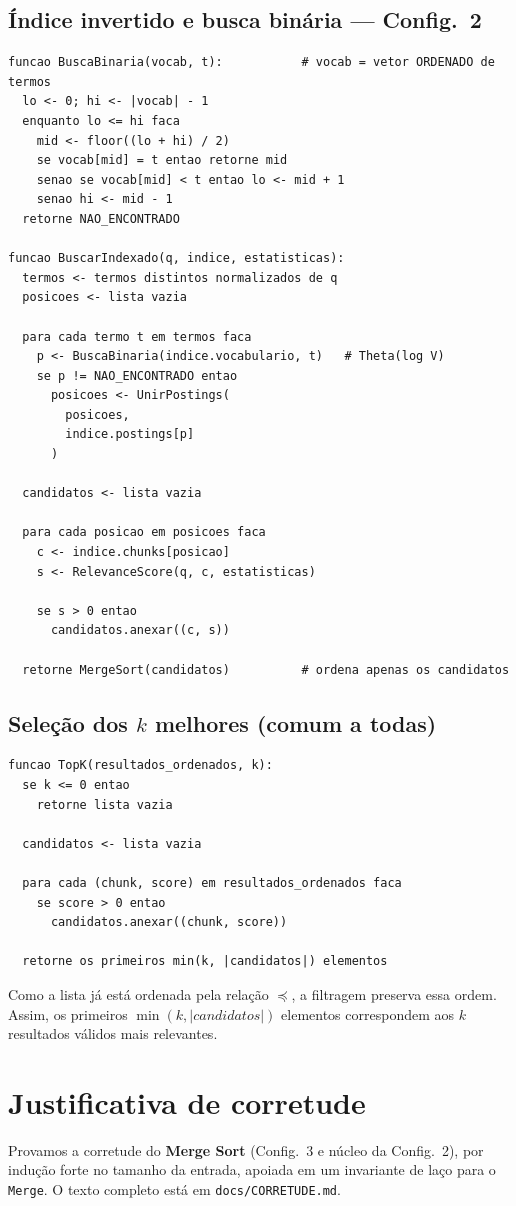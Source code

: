 \documentclass[11pt,a4paper]{article}
\begin{document}
\subsection{Índice invertido e busca binária --- Config.~2}
\begin{lstlisting}
funcao BuscaBinaria(vocab, t):           # vocab = vetor ORDENADO de termos
  lo <- 0; hi <- |vocab| - 1
  enquanto lo <= hi faca
    mid <- floor((lo + hi) / 2)
    se vocab[mid] = t entao retorne mid
    senao se vocab[mid] < t entao lo <- mid + 1
    senao hi <- mid - 1
  retorne NAO_ENCONTRADO

funcao BuscarIndexado(q, indice, estatisticas):
  termos <- termos distintos normalizados de q
  posicoes <- lista vazia

  para cada termo t em termos faca
    p <- BuscaBinaria(indice.vocabulario, t)   # Theta(log V)
    se p != NAO_ENCONTRADO entao
      posicoes <- UnirPostings(
        posicoes,
        indice.postings[p]
      )

  candidatos <- lista vazia

  para cada posicao em posicoes faca
    c <- indice.chunks[posicao]
    s <- RelevanceScore(q, c, estatisticas)

    se s > 0 entao
      candidatos.anexar((c, s))

  retorne MergeSort(candidatos)          # ordena apenas os candidatos
\end{lstlisting}

\subsection{Seleção dos $k$ melhores (comum a todas)}
\begin{lstlisting}
funcao TopK(resultados_ordenados, k):
  se k <= 0 entao
    retorne lista vazia

  candidatos <- lista vazia

  para cada (chunk, score) em resultados_ordenados faca
    se score > 0 entao
      candidatos.anexar((chunk, score))

  retorne os primeiros min(k, |candidatos|) elementos
\end{lstlisting}
Como a lista já está ordenada pela relação $\preceq$, a filtragem preserva essa
ordem. Assim, os primeiros $\min(k,|candidatos|)$ elementos correspondem aos
 $k$ resultados válidos mais relevantes.

\section{Justificativa de corretude}\label{sec:corretude}
Provamos a corretude do \textbf{Merge Sort} (Config.~3 e núcleo da Config.~2), por indução forte no
tamanho da entrada, apoiada em um invariante de laço para o \texttt{Merge}. O texto completo está em
\texttt{docs/CORRETUDE.md}.
\end{document}
